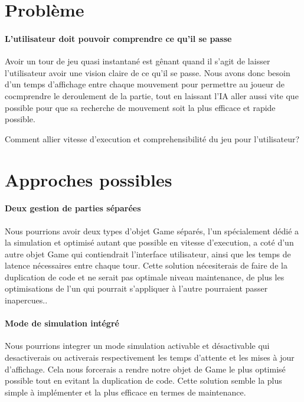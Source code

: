 \documentclass{scrreprt}
\begin{document}
    \section{Problème}

    \paragraph{L'utilisateur doit pouvoir comprendre ce qu'il se passe}
    Avoir un tour de jeu quasi instantané est gênant quand il s'agit de
    laisser l'utilisateur avoir une vision claire de ce qu'il se passe.
    Nous avons donc besoin d'un temps d'affichage entre chaque mouvement pour
    permettre au joueur de cocmprendre le deroulement de la partie, tout en
    laissant l'IA aller aussi vite que possible pour que sa recherche de
    mouvement soit la plus efficace et rapide possible.

    Comment allier vitesse d'execution et comprehensibilité du jeu pour
    l'utilisateur?

    \section{Approches possibles}

    \paragraph{Deux gestion de parties séparées}
    Nous pourrions avoir deux types d'objet Game séparés, l'un
    spécialement dédié a la simulation et optimisé autant que possible en
    vitesse d'execution, a coté d'un autre objet Game qui contiendrait
    l'interface utilisateur, ainsi que les temps de latence nécessaires entre
    chaque tour.
    Cette solution nécesiterais de faire de la duplication de
    code et ne serait pas optimale niveau maintenance, de plus les
    optimisations de l'un qui pourrait s'appliquer à l'autre pourraient
    passer inapercues..

    \paragraph{Mode de simulation intégré}
    Nous pourrions integrer un mode simulation activable et désactivable qui
    desactiverais ou activerais respectivement les temps d'attente et les
    mises à jour d'affichage.
    Cela nous forcerais a rendre notre objet de Game le plus optimisé
    possible tout en evitant la duplication de code.
    Cette solution semble la plus simple à implémenter et la plus efficace en
    termes de maintenance.
\end{document}
